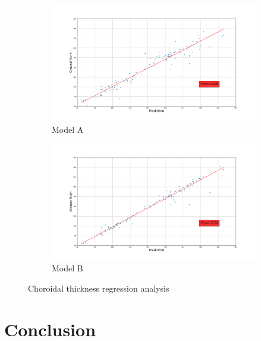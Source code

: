 \documentclass[12pt,a4paper]{scrartcl}
\begin{document}
\begin{figure}[H]
\centering
\begin{subfigure}{1\textwidth}
  \centering
  \includegraphics[width=\linewidth]{./results/model_A_choroidal_thickness.png}
  \caption{Model A}
  \label{fig:model_a_choroidal_thicknesss}
\end{subfigure}
\begin{subfigure}{1\textwidth}
  \centering
  \includegraphics[width=\linewidth]{./results/model_B_choroidal_thickness.png}
  \caption{Model B}
  \label{fig:model_b_choroidal_thickness}
\end{subfigure}
\caption{Choroidal thickness regression analysis}
\label{fig:choroidal_thickness}
\end{figure}

\section{Conclusion}
\end{document}
